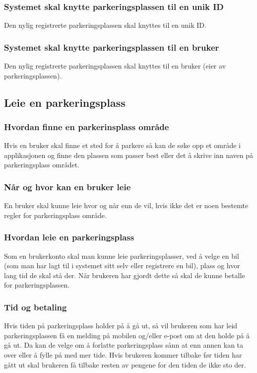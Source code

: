 \documentclass[12pt]{article}
\begin{document}
\subsubsection{Systemet skal knytte parkeringsplassen til en unik ID}
Den nylig registrerte parkeringsplassen skal knyttes til en unik ID.

\subsubsection{Systemet skal knytte parkeringsplassen til en bruker}
Den nylig registrerte parkeringsplassen skal knyttes til en bruker (eier av parkeringsplassen).

\subsection{Leie en parkeringsplass}

\subsubsection{Hvordan finne en parkerinsplass område}
Hvis en bruker skal finne et sted for å parkere så kan de søke opp et område i applikasjonen og finne den plassen som passer best eller det å skrive inn naven på parkeringsplass området.

\subsubsection{Når og hvor kan en bruker leie}
En bruker skal kunne leie hvor og når enn de vil, hvis ikke det er noen bestemte regler for parkeringsplass område. 

\subsubsection{Hvordan leie en parkeringsplass}
Som en brukerkonto skal man kunne leie parkeringsplasser, ved å velge en bil (som man har lagt til i systemet sitt selv eller registrere en bil), plass og hvor lang tid de skal stå der. Når brukeren har gjordt dette så skal de kunne betalle for parkeringsplassen.

\subsubsection{Tid og betaling}
Hvis tiden på parkeringsplass holder på å gå ut, så vil brukeren som har leid parkeringsplassen få en melding på mobilen og/eller e-post om at den holde på å gå ut. Da kan de velge om å forlatte parkeringsplass sånn at enn annen kan ta over eller å fylle på med mer tide. Hvis brukeren kommer tilbake før tiden har gått ut skal brukeren få tilbake resten av pengene for den tiden de ikke sto der.
\end{document}
